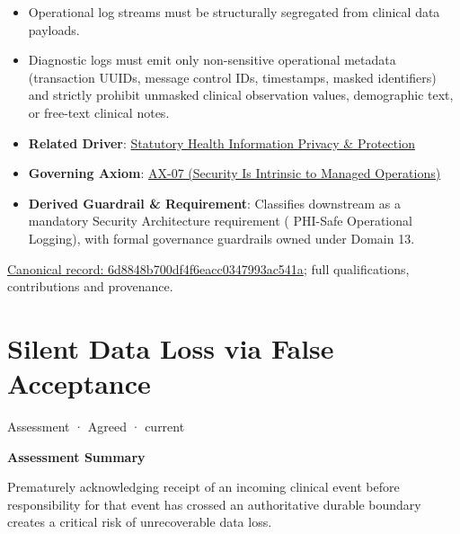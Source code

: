 \begin{itemize}


\item Operational log streams must be structurally segregated from clinical data payloads.

\item Diagnostic logs must emit only non-sensitive operational metadata (transaction UUIDs, message control IDs, timestamps, masked identifiers) and strictly prohibit unmasked clinical observation values, demographic text, or free-text clinical notes.

\item \textbf{Related Driver}: \href{\detokenize{../../../../../docs/markdown/01-motivation/drivers-assessments/drivers.md}}{Statutory Health Information Privacy \& Protection}

\item \textbf{Governing Axiom}: \hyperref[element:5de2ae2c3b794c2d9f3a14efd51d564f]{AX-07 (Security Is Intrinsic to Managed Operations)}

\item \textbf{Derived Guardrail \& Requirement}: Classifies downstream as a mandatory Security Architecture requirement (\texttt{} PHI-Safe Operational Logging), with formal governance guardrails owned under Domain 13.

\end{itemize}

{\footnotesize \href{../../../../continuum/motivation/assessment/6d8848b700df4f6eacc0347993ac541a.md}{Canonical record: 6d8848b700df4f6eacc0347993ac541a}; full qualifications, contributions and provenance.}\par
\section{Silent Data Loss via False Acceptance}

\label{element:9f185cd26a0f4118a0b28bb08134f472}
{\small Assessment · Agreed · current}\par

\par\medskip\textbf{Assessment Summary}\par


Prematurely acknowledging receipt of an incoming clinical event before responsibility for that event has crossed an authoritative durable boundary creates a critical risk of unrecoverable data loss.



